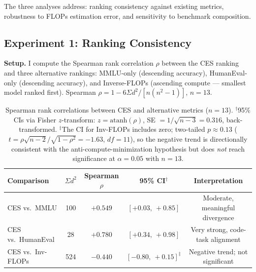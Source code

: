 \documentclass[12pt]{article}
\begin{document}
\bigskip

The three analyses address: ranking consistency against existing metrics, robustness to FLOPs estimation error, and sensitivity to benchmark composition.

\subsection{Experiment 1: Ranking Consistency}
\label{sec:exp1}

\textbf{Setup.} I compute the Spearman rank correlation $\rho$ between the CES ranking and three alternative rankings: MMLU-only (descending accuracy), HumanEval-only (descending accuracy), and Inverse-FLOPs (ascending compute --- smallest model ranked first). Spearman $\rho = 1 - 6\Sigma d^2 / [n(n^2-1)]$, $n=13$.

\begin{table}[H]
\centering
\begin{tabular}{lcccc}
\toprule
\textbf{Comparison} & $\Sigma d^2$ & \textbf{Spearman} $\rho$ & \textbf{95\% CI$^\dagger$} & \textbf{Interpretation} \\
\midrule
CES vs.\ MMLU      & 100 & $+0.549$ & $[+0.03,\ +0.85]$ & Moderate, meaningful divergence \\
CES vs.\ HumanEval &  28 & $+0.780$ & $[+0.34,\ +0.98]$ & Very strong, code-task alignment \\
CES vs.\ Inv-FLOPs & 524 & $-0.440$ & $[-0.80,\ +0.15]^\ddagger$ & Negative trend; not significant \\
\bottomrule
\end{tabular}
\caption{Spearman rank correlations between CES and alternative metrics ($n=13$). $^\dagger$95\% CIs via Fisher $z$-transform: $z = \mathrm{atanh}(\rho)$, SE $= 1/\sqrt{n-3} = 0.316$, back-transformed. $^\ddagger$The CI for Inv-FLOPs includes zero; two-tailed $p \approx 0.13$ ($t = \rho\sqrt{n-2}/\sqrt{1-\rho^2} = -1.63$, $df=11$), so the negative trend is directionally consistent with the anti-compute-minimization hypothesis but does \emph{not} reach significance at $\alpha=0.05$ with $n=13$.}
\end{table}
\end{document}
